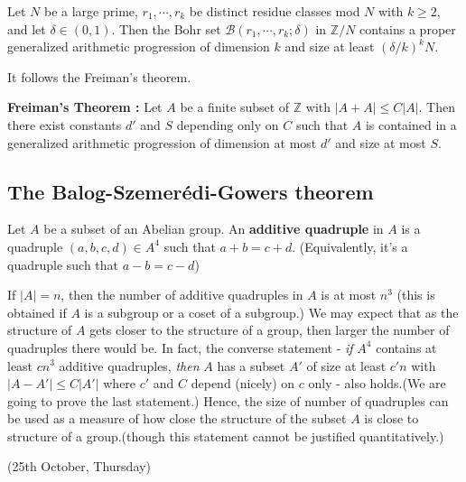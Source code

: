 \documentclass[12pt,a4paper]{report}
\begin{document}
\prop Let $N$ be a large prime, $r_1, \cdots, r_k$ be distinct residue classes mod $N$ with $k\geq 2$, and let $\delta\in (0,1)$. Then the Bohr set $\mathscr{B}(r_1, \cdots, r_k ;\delta)$ in $\mathbb{Z}/N$ contains a proper generalized arithmetic progression of dimension $k$ and size at least $(\delta/k)^k N$.
\s

It follows the Freiman's theorem.
\s

\textbf{Freiman's Theorem :} Let $A$ be a finite subset of $\mathbb{Z}$ with $|A+A|\leq C|A|$. Then there exist constants $d'$ and $S$ depending only on $C$ such that $A$ is contained in a generalized arithmetic progression of dimension at most $d'$ and size at most $S$.
\s

\digression
\s

\subsection*{The Balog-Szemer\'{e}di-Gowers theorem}

 Let $A$ be a subset of an Abelian group. An \textbf{additive quadruple} in $A$ is a quadruple $(a,b,c,d) \in A^4$ such that $a+b = c+d$. (Equivalently, it's a quadruple such that $a-b= c-d$)
\s

If $|A|=n$, then the number of additive quadruples in $A$ is at most $n^3$ (this is obtained if $A$ is a subgroup or a coset of a subgroup.) We may expect that as the structure of $A$ gets closer to the structure of a group, then larger the number of quadruples there would be. In fact, the converse statement - \emph{if} $A^4$ contains at least $cn^3$ additive quadruples, \emph{then} $A$ has a subset $A'$ of size at least $c'n$ with $|A-A'| \leq C|A'|$ where $c'$ and $C$ depend (nicely) on $c$ only - also holds.(We are going to prove the last statement.) Hence, the size of number of quadruples can be used as a measure of how close the structure of the subset $A$ is close to structure of a group.(though this statement cannot be justified quantitatively.)
\s

\newday

(25th October, Thursday)
\s
\end{document}
